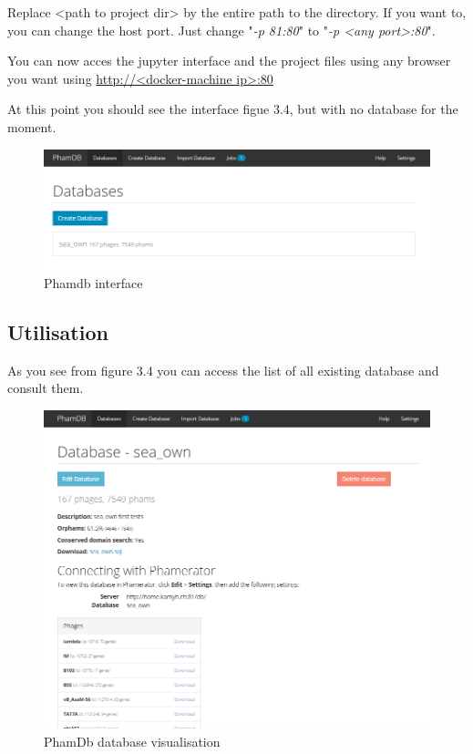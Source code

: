\documentclass[a4paper,11pt]{report}
\begin{document}
Replace <path to project dir> by the entire path to the directory. If you want to, you can change the host port. Just change "\textit{-p 81:80}" to "\textit{-p <any port>:80}".

You can now acces the jupyter interface and the project files using any browser you want using \url{http://<docker-machine ip>:80}

At this point you should see the interface figue 3.4, but with no database for the moment.

\begin{figure}[H] 
	\begin{center}
		\includegraphics[scale=0.45]{img/phamdb}
		\caption{Phamdb interface}
	\end{center}
\end{figure}

\subsection{Utilisation}
As you see from figure 3.4 you can access the list of all existing database and consult them.

\begin{figure}[H] 
	\begin{center}
		\includegraphics[scale=0.45]{img/phamdb_see_db}
		\caption{PhamDb database visualisation}
	\end{center}
\end{figure}
\end{document}

